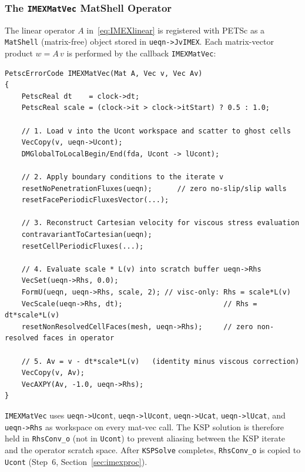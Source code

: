 \documentclass[12pt,a4paper]{article}
\begin{document}
	\subsubsection{The \texttt{IMEXMatVec} MatShell Operator}
	\label{sec:imexmatvec}

	The linear operator $A$ in~\eqref{eq:IMEXlinear} is registered with PETSc
	as a \texttt{MatShell} (matrix-free) object stored in \texttt{ueqn->JvIMEX}.
	Each matrix-vector product $w = A\,v$ is performed by the callback
	\texttt{IMEXMatVec}:

	\begin{lstlisting}
PetscErrorCode IMEXMatVec(Mat A, Vec v, Vec Av)
{
    PetscReal dt    = clock->dt;
    PetscReal scale = (clock->it > clock->itStart) ? 0.5 : 1.0;

    // 1. Load v into the Ucont workspace and scatter to ghost cells
    VecCopy(v, ueqn->Ucont);
    DMGlobalToLocalBegin/End(fda, Ucont -> lUcont);

    // 2. Apply boundary conditions to the iterate v
    resetNoPenetrationFluxes(ueqn);      // zero no-slip/slip walls
    resetFacePeriodicFluxesVector(...);

    // 3. Reconstruct Cartesian velocity for viscous stress evaluation
    contravariantToCartesian(ueqn);
    resetCellPeriodicFluxes(...);

    // 4. Evaluate scale * L(v) into scratch buffer ueqn->Rhs
    VecSet(ueqn->Rhs, 0.0);
    FormU(ueqn, ueqn->Rhs, scale, 2); // visc-only: Rhs = scale*L(v)
    VecScale(ueqn->Rhs, dt);                        // Rhs = dt*scale*L(v)
    resetNonResolvedCellFaces(mesh, ueqn->Rhs);     // zero non-resolved faces in operator

    // 5. Av = v - dt*scale*L(v)   (identity minus viscous correction)
    VecCopy(v, Av);
    VecAXPY(Av, -1.0, ueqn->Rhs);
}
	\end{lstlisting}

	\begin{notebox}
		\texttt{IMEXMatVec} uses \texttt{ueqn->Ucont}, \texttt{ueqn->lUcont},
		\texttt{ueqn->Ucat}, \texttt{ueqn->lUcat}, and \texttt{ueqn->Rhs} as
		workspace on every mat-vec call. The KSP solution is therefore held in
		\texttt{RhsConv\_o} (not in \texttt{Ucont}) to prevent aliasing between
		the KSP iterate and the operator scratch space. After \texttt{KSPSolve}
		completes, \texttt{RhsConv\_o} is copied to \texttt{Ucont} (Step~6,
		Section~\ref{sec:imexproc}).
	\end{notebox}
\end{document}
